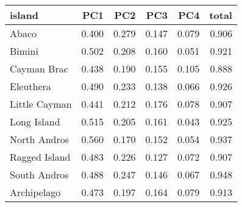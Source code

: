 
\begin{tabular}{l|r|r|r|r|r}
\hline
island & PC1 & PC2 & PC3 & PC4 & total\\
\hline
Abaco & 0.400 & 0.279 & 0.147 & 0.079 & 0.906\\
\hline
Bimini & 0.502 & 0.208 & 0.160 & 0.051 & 0.921\\
\hline
Cayman Brac & 0.438 & 0.190 & 0.155 & 0.105 & 0.888\\
\hline
Eleuthera & 0.490 & 0.233 & 0.138 & 0.066 & 0.926\\
\hline
Little Cayman & 0.441 & 0.212 & 0.176 & 0.078 & 0.907\\
\hline
Long Island & 0.515 & 0.205 & 0.161 & 0.043 & 0.925\\
\hline
North Andros & 0.560 & 0.170 & 0.152 & 0.054 & 0.937\\
\hline
Ragged Island & 0.483 & 0.226 & 0.127 & 0.072 & 0.907\\
\hline
South Andros & 0.488 & 0.247 & 0.146 & 0.067 & 0.948\\
\hline
Archipelago & 0.473 & 0.197 & 0.164 & 0.079 & 0.913\\
\hline
\end{tabular}
